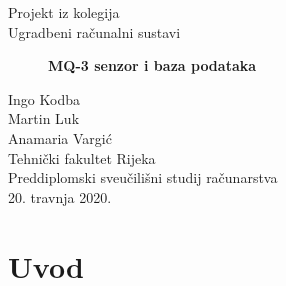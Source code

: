 \documentclass[12pt]{article}
\begin{document}
\begin{titlepage}
   \begin{center}
    \vspace*{2cm}
    \large Projekt iz kolegija\\
       Ugradbeni računalni sustavi\\
    \begin{figure}
       \centering\Large\bf{MQ-3 senzor i baza podataka}
     \end{figure}
    \vspace{1.5cm}
    \vspace{1cm}
       \large Ingo Kodba\\Martin Luk\\Anamaria Vargić \\
    \vfill
       	Tehnički fakultet Rijeka\\
        Preddiplomski sveučilišni studij računarstva\\
        \vspace{0.3cm}
      	20. travnja 2020.
   \end{center}
\end{titlepage}
\lstset{frame=single, breaklines=true}

\tableofcontents
\newpage
{}


\newpage
\section{Uvod}

\newpage
\section{}

\subsection{}
\end{document}

